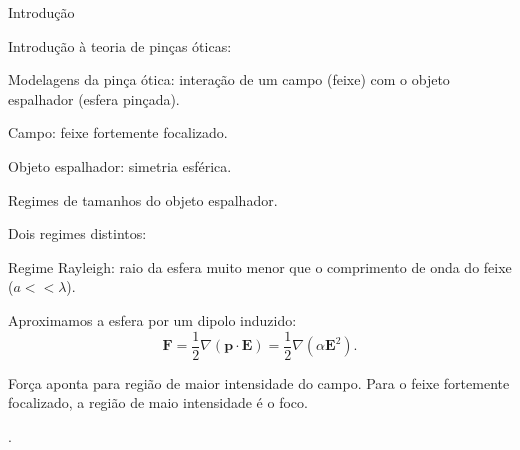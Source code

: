 \documentclass[10pt]{beamer}
\begin{document}

\begin{frame}[fragile]{Introdução}

Introdução à teoria de pinças óticas: \\
    \begin{center}
        Modelagens da pinça ótica: interação de um campo (feixe) com o objeto espalhador (esfera pinçada).

        Campo: feixe fortemente focalizado.

        Objeto espalhador: simetria esférica.

        

    \end{center}

\end{frame}

\begin{frame}[fragile]{Regimes de tamanhos do objeto espalhador.}

Dois regimes distintos: \\
    \begin{center}
        Regime Rayleigh: raio da esfera muito menor que o comprimento de onda do feixe ($a<<\lambda$).

        Aproximamos a esfera por um dipolo induzido:
        \begin{equation}
        {\mathbf F} = \frac{1}{2}\nabla({\mathbf p}\cdot{\mathbf E})=\frac{1}{2}\nabla(\alpha{\mathbf E}^2).
        \end{equation}

        Força aponta para região de maior intensidade do campo. Para o feixe fortemente focalizado, a região de maio intensidade é o foco.

    \end{center}
.
\end{frame}
\end{document}
